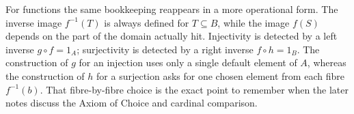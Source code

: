 For functions the same bookkeeping reappears in a more operational form.  The inverse image \(f^{-1}(T)\) is always defined for \(T\subseteq B\), while the image \(f(S)\) depends on the part of the domain actually hit.  Injectivity is detected by a left inverse \(g\circ f=1_A\); surjectivity is detected by a right inverse \(f\circ h=1_B\).  The construction of \(g\) for an injection uses only a single default element of \(A\), whereas the construction of \(h\) for a surjection asks for one chosen element from each fibre \(f^{-1}(b)\).  That fibre-by-fibre choice is the exact point to remember when the later notes discuss the Axiom of Choice and cardinal comparison.

